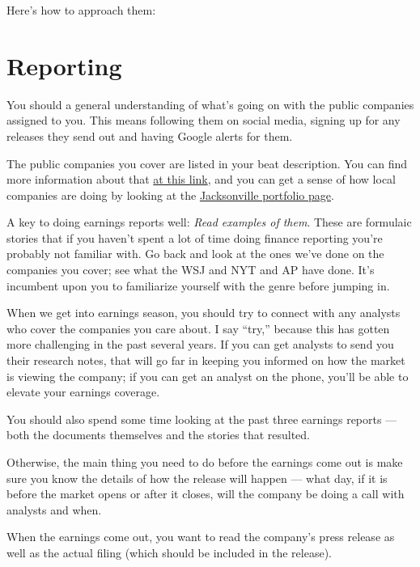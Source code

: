 \documentclass[
  11pt,
  american,
  letterpaperpaper,
  extrafontsizes,onecolumn,openright
  ]{memoir}
\begin{document}
Here's how to approach them:

\hypertarget{reporting}{%
\section*{Reporting}\label{reporting}}

You should a general understanding of what's going on with the public companies assigned to you. This means following them on social media, signing up for any releases they send out and having Google alerts for them.

The public companies you cover are listed in your beat description. You can find more information about that \href{https://docs.google.com/spreadsheets/d/1qHBcKC3Mf6htw1jjNoGjYAAig3ClWeULnrzbzqjRinQ/edit\#gid=0}{at this link}, and you can get a sense of how local companies are doing by looking at the \href{https://docs.google.com/spreadsheets/d/1DHLnqa5YTy08v2cuSJFoY9iJV5HzN5zjMvVONiG-zas/edit\#gid=0}{Jacksonville portfolio page}.

A key to doing earnings reports well: \emph{Read examples of them}. These are formulaic stories that if you haven't spent a lot of time doing finance reporting you're probably not familiar with. Go back and look at the ones we've done on the companies you cover; see what the WSJ and NYT and AP have done. It's incumbent upon you to familiarize yourself with the genre before jumping in.

When we get into earnings season, you should try to connect with any analysts who cover the companies you care about. I say \enquote{try,} because this has gotten more challenging in the past several years. If you can get analysts to send you their research notes, that will go far in keeping you informed on how the market is viewing the company; if you can get an analyst on the phone, you'll be able to elevate your earnings coverage.

You should also spend some time looking at the past three earnings reports --- both the documents themselves and the stories that resulted.

Otherwise, the main thing you need to do before the earnings come out is make sure you know the details of how the release will happen --- what day, if it is before the market opens or after it closes, will the company be doing a call with analysts and when.

When the earnings come out, you want to read the company's press release as well as the actual filing (which should be included in the release).
\end{document}
